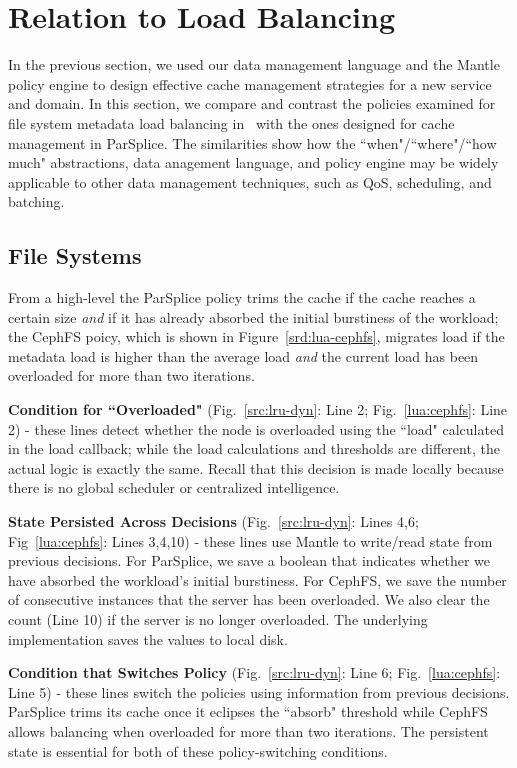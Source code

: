 \section{Relation to Load Balancing}
\label{sec:relation-to-load-balancing}

In the previous section, we used our data management language and the Mantle
policy engine to design effective cache management strategies for a new service
and domain. In this section, we compare and contrast the policies examined for
file system metadata load balancing in~\cite{sevilla:sc15-mantle} with the ones
designed for cache management in ParSplice. The similarities show how the
``when"/``where"/``how much" abstractions, data anagement language, and policy
engine may be widely applicable to other data management techniques, such as
QoS, scheduling, and batching.

\subsection{File Systems}
From a high-level the ParSplice policy trims the cache if the cache reaches a
certain size {\it and} if it has already absorbed the initial burstiness of the
workload; the CephFS poicy, which is shown in Figure~\ref{srd:lua-cephfs},
migrates load if the metadata load is higher than the average load {\it and}
the current load has been overloaded for more than two iterations.

\textbf{Condition for ``Overloaded"} (Fig.~\ref{src:lru-dyn}: Line 2;
Fig.~\ref{lua:cephfs}: Line 2) - these lines detect whether the node is
overloaded using the ``load" calculated in the load callback; while the load
calculations and thresholds are different, the actual logic is exactly the
same.  Recall that this decision is made locally because there is no global
scheduler or centralized intelligence. 

\textbf{State Persisted Across Decisions} (Fig.~\ref{src:lru-dyn}: Lines 4,6;
Fig~\ref{lua:cephfs}: Lines 3,4,10) - these lines use Mantle to write/read state
from previous decisions.  For ParSplice, we save a boolean that indicates
whether we have absorbed the workload's initial burstiness. For CephFS, we save
the number of consecutive instances that the server has been overloaded. We
also clear the count (Line 10) if the server is no longer overloaded. The
underlying implementation saves the values to local disk.

\textbf{Condition that Switches Policy} (Fig.~\ref{src:lru-dyn}: Line 6;
Fig.~\ref{lua:cephfs}: Line 5) - these lines switch the policies using
information from previous decisions. ParSplice trims its cache once it eclipses
the ``absorb" threshold while CephFS allows balancing when overloaded for more
than two iterations. The persistent state is essential for both of these
policy-switching conditions.

